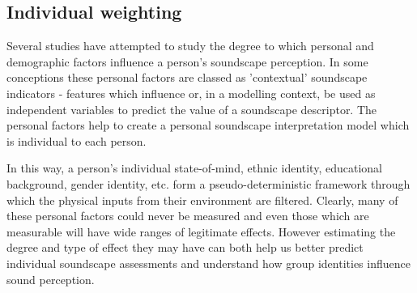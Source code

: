 


\subsection{Individual weighting}
Several studies have attempted to study the degree to which personal and demographic factors influence a person's soundscape perception. In some conceptions \citep{Kou2020effects,Erfanian2019Psychophysiological} these personal factors are classed as 'contextual' soundscape indicators - features which influence or, in a modelling context, be used as independent variables to predict the value of a soundscape descriptor. The personal factors help to create a personal soundscape interpretation model which is individual to each person.

In this way, a person's individual state-of-mind, ethnic identity, educational background, gender identity, etc. form a pseudo-deterministic framework %
through which the physical inputs from their environment are filtered. Clearly, many of these personal factors could never be measured and even those which are measurable will have wide ranges of legitimate effects. However estimating the degree and type of effect they may have can both help us better predict individual soundscape assessments and understand how group identities influence sound perception.


